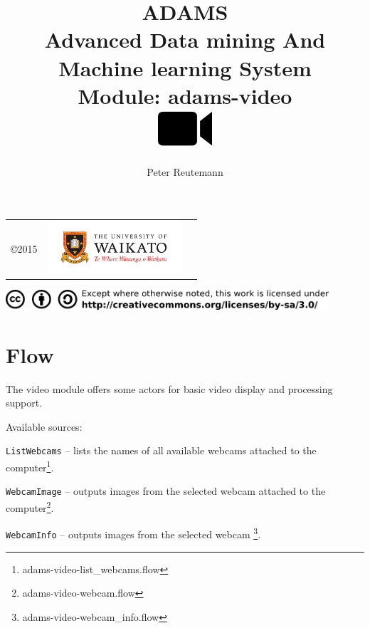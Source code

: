 \documentclass[a4paper]{book}
\title{
  \textbf{ADAMS} \\
  {\Large \textbf{A}dvanced \textbf{D}ata mining \textbf{A}nd \textbf{M}achine
  learning \textbf{S}ystem} \\
  {\Large Module: adams-video} \\
  \vspace{1cm}
  \includegraphics[width=2cm]{images/video-module.png} \\
}
\author{
  Peter Reutemann
}
\begin{document}
\begin{titlepage}
\maketitle

\thispagestyle{empty}
\center
\begin{table}[b]
	\begin{tabular}{c l l}
		\parbox[c][2cm]{2cm}{\copyright 2015} &
		\parbox[c][2cm]{5cm}{\includegraphics[width=5cm]{images/coat_of_arms.pdf}} \\
	\end{tabular}
	\includegraphics[width=12cm]{images/cc.png} \\
\end{table}

\end{titlepage}

\tableofcontents

\chapter{Flow}
The video module offers some actors for basic video display and processing support.

\noindent Available sources:
\begin{tight_itemize}
    \item \texttt{ListWebcams} -- lists the names of all available webcams
    attached to the computer\footnote{adams-video-list\_webcams.flow}.
    \item \texttt{WebcamImage} -- outputs images from the selected webcam
    attached to the computer\footnote{adams-video-webcam.flow}.
    \item \texttt{WebcamInfo} -- outputs images from the selected webcam
    \footnote{adams-video-webcam\_info.flow}.
\end{tight_itemize}
\end{document}
